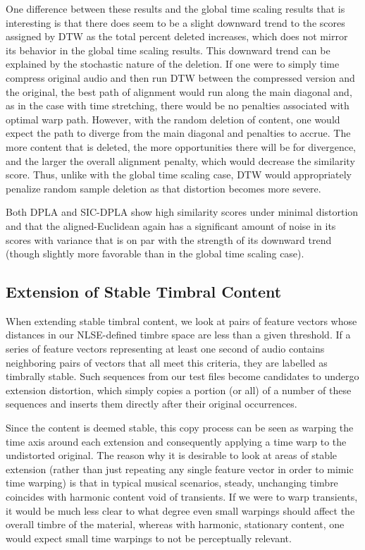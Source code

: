 \documentclass[a4paper,12pt]{report} 	%
\numberwithin{figure}{chapter}
\numberwithin{table}{chapter}
\numberwithin{equation}{chapter}
\begin{document}
\begin{flushleft}
One difference between these results and the global time scaling results that is interesting is that there does seem to be a slight downward trend to the scores assigned by DTW as the total percent deleted increases, which does not mirror its behavior in the global time scaling results. This downward trend can be explained by the stochastic nature of the deletion. If one were to simply time compress original audio and then run DTW between the compressed version and the original, the best path of alignment would run along the main diagonal and, as in the case with time stretching, there would be no penalties associated with optimal warp path. However, with the random deletion of content, one would expect the path to diverge from the main diagonal and penalties to accrue. The more content that is deleted, the more opportunities there will be for divergence, and the larger the overall alignment penalty, which would decrease the similarity score. Thus, unlike with the global time scaling case, DTW would appropriately penalize random sample deletion as that distortion becomes more severe.

Both DPLA and SIC-DPLA show high similarity scores under minimal distortion and that the aligned-Euclidean again has a significant amount of noise in its scores with variance that is on par with the strength of its downward trend (though slightly more favorable than in the global time scaling case).

\subsection{Extension of Stable Timbral Content}
When extending stable timbral content, we look at pairs of feature vectors whose distances in our NLSE-defined timbre space are less than a given threshold. If a series of feature vectors representing at least one second of audio contains neighboring pairs of vectors that all meet this criteria, they are labelled as timbrally stable. Such sequences from our test files become candidates to undergo extension distortion, which simply copies a portion (or all) of a number of these sequences and inserts them directly after their original occurrences.

Since the content is deemed stable, this copy process can be seen as warping the time axis around each extension and consequently applying a time warp to the undistorted original. The reason why it is desirable to look at areas of stable extension (rather than just repeating any single feature vector in order to mimic time warping) is that in typical musical scenarios, steady, unchanging timbre coincides with harmonic content void of transients. If we were to warp transients, it would be much less clear to what degree even small warpings should affect the overall timbre of the material, whereas with harmonic, stationary content, one would expect small time warpings to not be perceptually relevant.


\end{flushleft}
\end{document}
